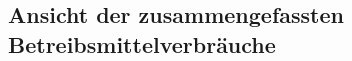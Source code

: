 \subsection{Ansicht der zusammengefassten Betreibsmittelverbräuche}
\label{app:AnsichtBetreibsmittelverbräuche}

